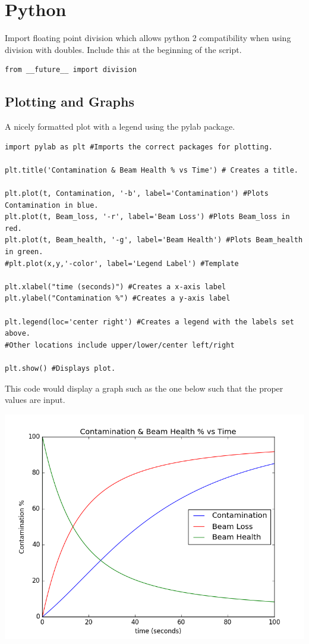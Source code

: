 \chapter{Python}
\thispagestyle{fancy}
\lstset{language=Python}

Import floating point division which allows python 2 compatibility when using division with doubles. Include this at the beginning of the script.
\begin{lstlisting}
from __future__ import division
\end{lstlisting}

\section{Plotting and Graphs}

A nicely formatted plot with a legend using the pylab package.
\begin{lstlisting}
import pylab as plt #Imports the correct packages for plotting.

plt.title('Contamination & Beam Health % vs Time') # Creates a title.

plt.plot(t, Contamination, '-b', label='Contamination') #Plots Contamination in blue.
plt.plot(t, Beam_loss, '-r', label='Beam Loss') #Plots Beam_loss in red.
plt.plot(t, Beam_health, '-g', label='Beam Health') #Plots Beam_health in green.
#plt.plot(x,y,'-color', label='Legend Label') #Template

plt.xlabel("time (seconds)") #Creates a x-axis label
plt.ylabel("Contamination %") #Creates a y-axis label

plt.legend(loc='center right') #Creates a legend with the labels set above.
#Other locations include upper/lower/center left/right

plt.show() #Displays plot.
\end{lstlisting}
This code would display a graph such as the one below such that the proper values are input.

\includegraphics[width=0.5\linewidth]{./Images/Figures/figure_1-4}
